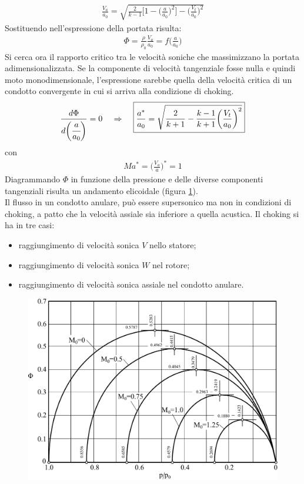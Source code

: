 \begin{align*}
\frac{V_a}{a_0} = \sqrt{\frac{2}{k-1} \bigg[ 1- \bigg( \frac{a}{a_0} \bigg)^2 \bigg] - \bigg( \frac{V_t}{a_0} \bigg)^2}
\end{align*}
Sostituendo nell'espressione della portata risulta:
\begin{align*}
\Phi = \frac{\rho}{\rho_0} \frac{V_a}{a_0} = f \bigg( \frac{a}{a_0} \bigg)
\end{align*}
Si cerca ora il rapporto critico tra le velocità soniche che massimizzano la portata adimensionalizzata. Se la componente di velocità tangenziale fosse nulla e quindi moto monodimensionale, l'espressione sarebbe quella della velocità critica di un condotto convergente in cui si arriva alla condizione di choking.
\begin{align*}
\frac{d\Phi}{d \bigg( \cfrac{a}{a_0} \bigg)}=0 \;\;\;\; \Rightarrow \;\;\;\; \boxed{ \frac{a^*}{a_0} = \sqrt{\frac{2}{k+1} - \frac{k-1}{k+1} \bigg( \frac{V_t}{a_0} \bigg)^2} }
\end{align*}
con
\begin{align*}
Ma^* = \bigg( \frac{V_a}{a} \bigg)^* = 1
\end{align*}
Diagrammando $\Phi$ in funzione della pressione e delle diverse componenti tangenziali risulta un andamento elicoidale (figura \ref{fd:PortCondAn}).\\
Il flusso in un condotto anulare, può essere supersonico ma non in condizioni di choking, a patto che la velocità assiale sia inferiore a quella acustica. Il choking si ha in tre casi:
\begin{itemize}
\item raggiungimento di velocità sonica $V$ nello statore;
\item raggiungimento di velocità sonica $W$ nel rotore;
\item raggiungimento di velocità sonica assiale nel condotto anulare.
\end{itemize}
\begin{figure}
\centering
  \includegraphics[width=.7\textwidth]{fig/PortCondAn.pdf}
\caption{}
\label{fd:PortCondAn}
\end{figure}

